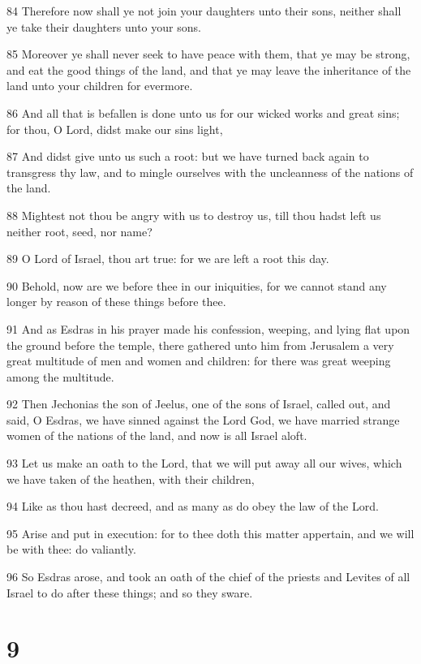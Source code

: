 \par 84 Therefore now shall ye not join your daughters unto their sons, neither shall ye take their daughters unto your sons.
\par 85 Moreover ye shall never seek to have peace with them, that ye may be strong, and eat the good things of the land, and that ye may leave the inheritance of the land unto your children for evermore.
\par 86 And all that is befallen is done unto us for our wicked works and great sins; for thou, O Lord, didst make our sins light,
\par 87 And didst give unto us such a root: but we have turned back again to transgress thy law, and to mingle ourselves with the uncleanness of the nations of the land.
\par 88 Mightest not thou be angry with us to destroy us, till thou hadst left us neither root, seed, nor name?
\par 89 O Lord of Israel, thou art true: for we are left a root this day.
\par 90 Behold, now are we before thee in our iniquities, for we cannot stand any longer by reason of these things before thee.
\par 91 And as Esdras in his prayer made his confession, weeping, and lying flat upon the ground before the temple, there gathered unto him from Jerusalem a very great multitude of men and women and children: for there was great weeping among the multitude.
\par 92 Then Jechonias the son of Jeelus, one of the sons of Israel, called out, and said, O Esdras, we have sinned against the Lord God, we have married strange women of the nations of the land, and now is all Israel aloft.
\par 93 Let us make an oath to the Lord, that we will put away all our wives, which we have taken of the heathen, with their children,
\par 94 Like as thou hast decreed, and as many as do obey the law of the Lord.
\par 95 Arise and put in execution: for to thee doth this matter appertain, and we will be with thee: do valiantly.
\par 96 So Esdras arose, and took an oath of the chief of the priests and Levites of all Israel to do after these things; and so they sware.

\chapter{9}

